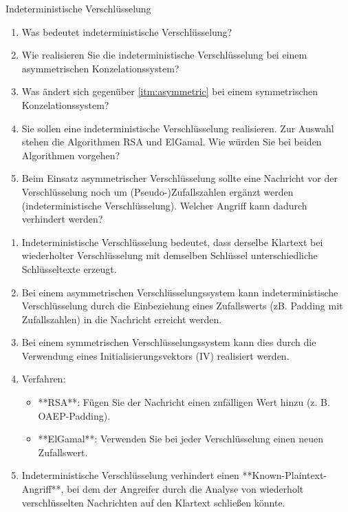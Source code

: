\documentclass{article}
\begin{document}
\setcounter{subsection}{104}
\begin{exercise}{Indeterministische Verschlüsselung}\label{ex:indeterministic}
  \begin{enumerate}
    \item Was bedeutet indeterministische Verschlüsselung?
    \item\label{itm:asymmetric} Wie realisieren Sie die indeterministische Verschlüsselung bei einem asymmetrischen Konzelationssystem?
    \item Was ändert sich gegenüber \ref{itm:asymmetric} bei einem symmetrischen Konzelationssystem?
    \item Sie sollen eine indeterministische Verschlüsselung realisieren. Zur Auswahl stehen die Algorithmen RSA und ElGamal. Wie würden Sie bei beiden Algorithmen vorgehen?
    \item Beim Einsatz asymmetrischer Verschlüsselung sollte eine Nachricht vor der Verschlüsselung noch um (Pseudo-)Zufallszahlen ergänzt werden (indeterministische Verschlüsselung). Welcher Angriff kann dadurch verhindert werden?
  \end{enumerate}

  \begin{solution}
    \begin{enumerate}
        \item Indeterministische Verschlüsselung bedeutet, dass derselbe Klartext bei wiederholter Verschlüsselung mit demselben Schlüssel unterschiedliche Schlüsseltexte erzeugt.
        \item Bei einem asymmetrischen Verschlüsselungssystem kann indeterministische Verschlüsselung durch die Einbeziehung eines Zufallswerts (zB. Padding mit Zufallszahlen) in die Nachricht erreicht werden.
        \item Bei einem symmetrischen Verschlüsselungssystem kann dies durch die Verwendung eines Initialisierungsvektors (IV) realisiert werden.
        \item Verfahren:
        \begin{itemize}
            \item **RSA**: Fügen Sie der Nachricht einen zufälligen Wert hinzu (z. B. OAEP-Padding).
            \item **ElGamal**: Verwenden Sie bei jeder Verschlüsselung einen neuen Zufallswert.
        \end{itemize}
        \item Indeterministische Verschlüsselung verhindert einen **Known-Plaintext-Angriff**, bei dem der Angreifer durch die Analyse von wiederholt verschlüsselten Nachrichten auf den Klartext schließen könnte.
    \end{enumerate}
  \end{solution}
\end{exercise}
\end{document}
